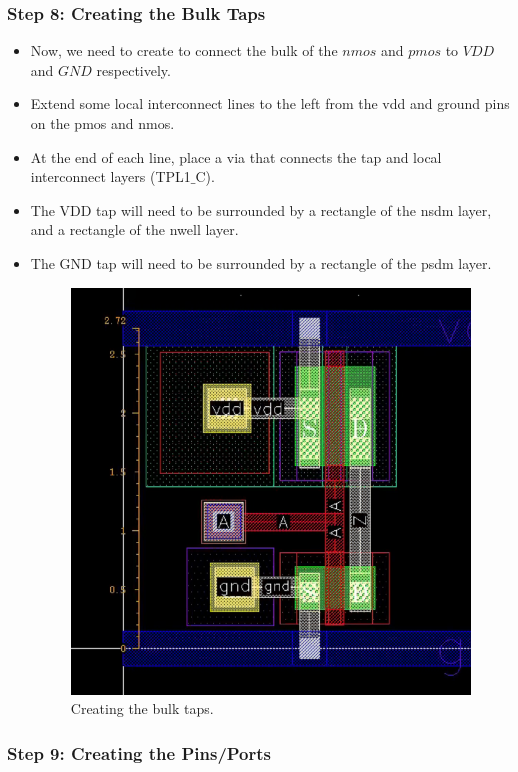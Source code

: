 \subsubsection*{Step 8: Creating the Bulk Taps}
\begin{itemize}
	\item Now, we need to create to connect the bulk of the $nmos$ and $pmos$ to $VDD$ and $GND$ respectively.
	\item Extend some local interconnect lines to the left from the vdd and ground pins on the pmos and nmos.
	\item At the end of each line, place a via that connects the tap and local interconnect layers (TPL1$\_$C).
	\item The VDD tap will need to be surrounded by a rectangle of the nsdm layer, and a rectangle of the nwell layer.
	\item The GND tap will need to be surrounded by a rectangle of the psdm layer.

	\begin{figure}[!h]
		\centering
		\includegraphics[scale=0.33]{figures/lab2/8}
						\caption{Creating the bulk taps.}
	\end{figure}
\end{itemize}

\subsubsection*{Step 9: Creating the Pins/Ports}


